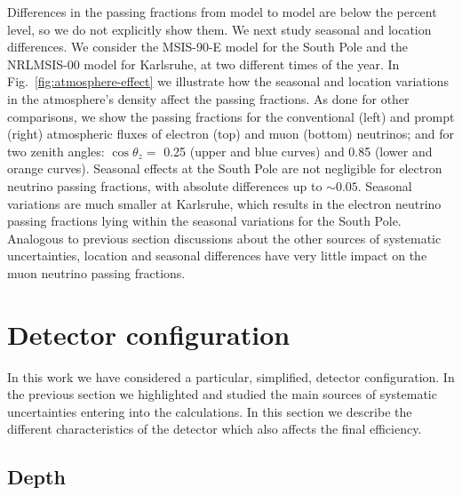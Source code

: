\documentclass[aps,prd,showpacs,letterpaper,onecolumn,longbibliography,superscriptaddress,notitlepage,nofootinbib]{revtex4-1}%
\begin{document}
Differences in the passing fractions from model to model are below the percent level, so we do not explicitly show them. We next study seasonal and location differences. We consider the MSIS-90-E model for the South Pole and the NRLMSIS-00 model for Karlsruhe, at two different times of the year. In Fig.~\ref{fig:atmosphere-effect} we illustrate how the seasonal and location variations in the atmosphere's density affect the passing fractions. As done for other comparisons, we show the passing fractions for the conventional (left) and prompt (right) atmospheric fluxes of electron (top) and muon (bottom) neutrinos; and for two zenith angles: $\cos\theta_z = $ 0.25 (upper and blue curves) and 0.85 (lower and orange curves). Seasonal effects at the South Pole are not negligible for electron neutrino passing fractions, with absolute differences up to $\sim 0.05$. Seasonal variations are much smaller at Karlsruhe, which results in the electron neutrino passing fractions lying within the seasonal variations for the South Pole. Analogous to previous section discussions about the other sources of systematic uncertainties, location and seasonal differences have very little impact on the muon neutrino passing fractions.

\section{Detector configuration}
\label{sec:detector}

In this work we have considered a particular, simplified, detector configuration. In the previous section we highlighted and studied the main sources of systematic uncertainties entering into the calculations. In this section we describe the different characteristics of the detector which also affects the final efficiency.

\subsection{Depth}
\label{sec:depth}
\end{document}
